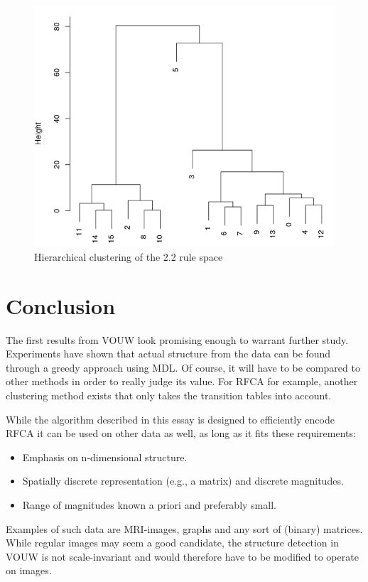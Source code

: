 \documentclass{llncs}
\begin{document}
\begin{figure}
\centering
\includegraphics[scale=0.5]{cluster-2-2.png}
\caption{Hierarchical clustering of the 2.2 rule space}
\label{figure:cluster}
\end{figure}

\section{Conclusion}
The first results from VOUW look promising enough to warrant further study. Experiments have shown that actual structure from the data can be found through a greedy approach using MDL. Of course, it will have to be compared to other methods in order to really judge its value. For RFCA for example, another clustering method exists that only takes the transition tables into account.

While the algorithm described in this essay is designed to efficiently encode RFCA it can be used on other data as well, as long as it fits these requirements:
\begin{itemize}
\item Emphasis on n-dimensional structure.
\item Spatially discrete representation (e.g., a matrix) and discrete magnitudes.
\item Range of magnitudes known a priori and preferably small.
\end{itemize}
Examples of such data are MRI-images, graphs and any sort of (binary) matrices. While regular images may seem a good candidate, the structure detection in VOUW is not scale-invariant and would therefore have to be modified to operate on images.
\end{document}
